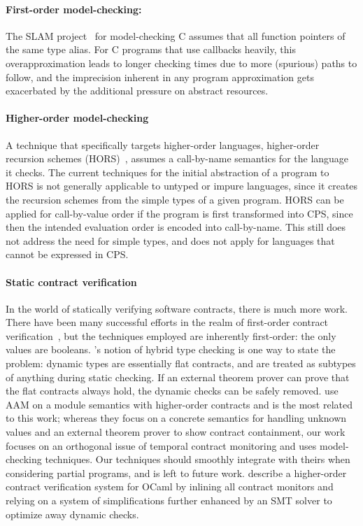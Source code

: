 \documentclass[preprint,onecolumn,9pt]{sigplanconf} %
\begin{document}
\paragraph{First-order model-checking:}{
The SLAM project~\citep{?} for model-checking C assumes that all function pointers of the same type alias.
%
For C programs that use callbacks heavily, this overapproximation leads to longer checking times due to more (spurious) paths to follow, and the imprecision inherent in any program approximation gets exacerbated by the additional pressure on abstract resources.
}
\paragraph{Higher-order model-checking}{
A technique that specifically targets higher-order languages, higher-order recursion schemes (HORS)~\citep{?}, assumes a call-by-name semantics for the language it checks.
%
The current techniques for the initial abstraction of a program to HORS is not generally applicable to untyped or impure languages, since it creates the recursion schemes from the simple types of a given program.
%
HORS can be applied for call-by-value order if the program is first transformed into CPS, since then the intended evaluation order is encoded into call-by-name.
%
This still does not address the need for simple types, and does not apply for languages that cannot be expressed in CPS.
}
\paragraph{Static contract verification}{
In the world of statically verifying software contracts, there is much more work.
%
There have been many successful efforts in the realm of first-order contract verification~\citep{?,?,?}, but the techniques employed are inherently first-order: the only values are booleans.
%
\citet{flanagan:hybrid-type-checking}'s notion of hybrid type checking is one way to state the problem: dynamic types are essentially flat contracts, and are treated as subtypes of anything during static checking.
%
If an external theorem prover can prove that the flat contracts always hold, the dynamic checks can be safely removed.
%
\citet{dvanhorn:oopsla2012:symbolic-eval} use AAM on a module semantics with higher-order contracts and is the most related to this work; whereas they focus on a concrete semantics for handling unknown values and an external theorem prover to show contract containment, our work focuses on an orthogonal issue of temporal contract monitoring and uses model-checking techniques.
%
Our techniques should smoothly integrate with theirs when considering partial programs, and is left to future work.
%
\citet{dvanhorn:xu:ocaml-simplifier} describe a higher-order contract verification system for OCaml by inlining all contract monitors and relying on a system of simplifications further enhanced by an SMT solver to optimize away dynamic checks.
}
\end{document}
